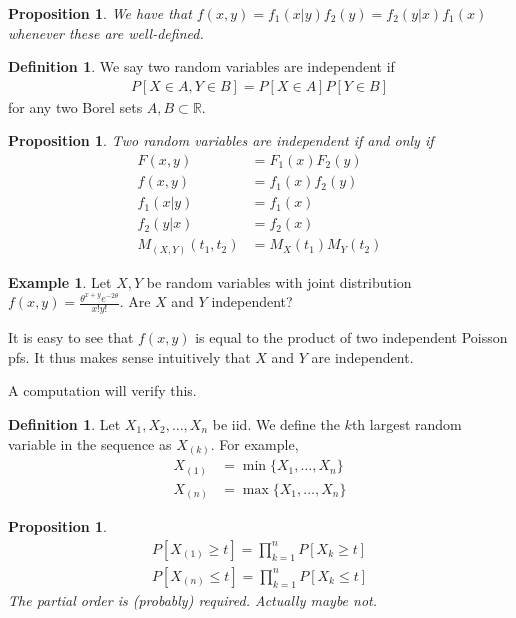 \documentclass[11pt]{amsart}
\newtheorem{proposition}[theorem]{Proposition}
\theoremstyle{definition}
\newtheorem{definition}[theorem]{Definition}
\newtheorem{example}[theorem]{Example}
\numberwithin{equation}{section}
\begin{document}
\begin{proposition}
    We have that $f(x,y)=f_1(x|y)f_2(y)=f_2(y|x)f_1(x)$ whenever these are well-defined.
\end{proposition}
\begin{definition}
    We say two random variables are independent if 
    \begin{align*}
        P[X\in A,Y\in B]=P[X\in A]P[Y\in B]
    \end{align*}
    for any two Borel sets $A,B\subset\mathbb R$.
\end{definition}
\begin{proposition}
    Two random variables are independent if and only if
    \begin{align*}
        F(x,y)&=F_1(x)F_2(y)\\
        f(x,y)&=f_1(x)f_2(y)\\
        f_1(x|y)&=f_1(x)\\
        f_2(y|x)&=f_2(x)\\
        M_{(X,Y)}(t_1,t_2)&=M_X(t_1)M_Y(t_2)
    \end{align*}
\end{proposition}
\begin{example}
    Let $X,Y$ be random variables with joint distribution $f(x,y)=\frac{\theta^{x+y}e^{-2\theta}}{x!y!}$. Are $X$ and $Y$ independent?

    It is easy to see that $f(x,y)$ is equal to the product of two independent Poisson pfs. It thus makes sense intuitively that $X$ and $Y$ are independent.

    A computation will verify this.
\end{example}
\begin{definition}
    Let $X_1,X_2,\ldots,X_n$ be iid. We define the $k$th largest random variable in the sequence as $X_{(k)}$. For example,
    \begin{align*}
        X_{(1)}&=\min\{X_1,\ldots,X_n\}\\
        X_{(n)}&=\max\{X_1,\ldots,X_n\}
    \end{align*}
\end{definition}
\begin{proposition}
    \begin{align*}
        P[X_{(1)}\ge t]=\prod_{k=1}^nP[X_k\ge t]\\
        P[X_{(n)}\le t]=\prod_{k=1}^nP[X_k\le t]
    \end{align*}
    The partial order is (probably) required. Actually maybe not.
\end{proposition}
\end{document}
